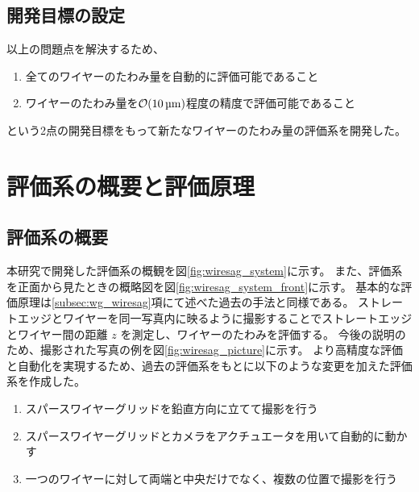 \documentclass[../../main.tex]{subfiles}
\begin{document}
\subsection{開発目標の設定}
以上の問題点を解決するため、
\begin{enumerate}
    \item 全てのワイヤーのたわみ量を自動的に評価可能であること
    \item ワイヤーのたわみ量を$\order{\SI{10}{\micro m}}$程度の精度で評価可能であること
\end{enumerate}
という2点の開発目標をもって新たなワイヤーのたわみ量の評価系を開発した。

\section{評価系の概要と評価原理}
\subsection{評価系の概要}
本研究で開発した評価系の概観を図\ref{fig:wiresag_system}に示す。
また、評価系を正面から見たときの概略図を図\ref{fig:wiresag_system_front}に示す。
基本的な評価原理は\ref{subsec:wg_wiresag}項にて述べた過去の手法と同様である。
ストレートエッジとワイヤーを同一写真内に映るように撮影することでストレートエッジとワイヤー間の距離 $z$ を測定し、ワイヤーのたわみを評価する。
今後の説明のため、撮影された写真の例を図\ref{fig:wiresag_picture}に示す。
より高精度な評価と自動化を実現するため、過去の評価系をもとに以下のような変更を加えた評価系を作成した。
\begin{enumerate}
    \item スパースワイヤーグリッドを鉛直方向に立てて撮影を行う
    \item スパースワイヤーグリッドとカメラをアクチュエータを用いて自動的に動かす
    \item 一つのワイヤーに対して両端と中央だけでなく、複数の位置で撮影を行う
\end{enumerate}
\end{document}
